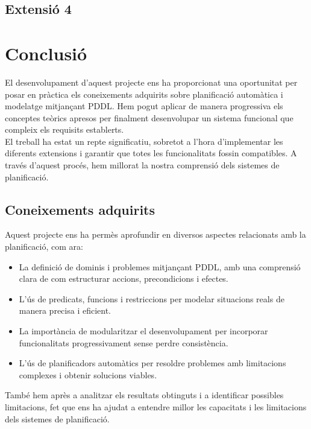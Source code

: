 \documentclass[a4paper]{article}
\begin{document}
	\subsection{Extensió 4}
	
	
	
	\newpage
	\section{Conclusió}
	
	El desenvolupament d'aquest projecte ens ha proporcionat una oportunitat per posar en pràctica els coneixements adquirits sobre planificació automàtica i modelatge mitjançant PDDL. Hem pogut aplicar de manera progressiva els conceptes teòrics apresos per finalment desenvolupar un sistema funcional que compleix els requisits establerts.\\ 
	
	El treball ha estat un repte significatiu, sobretot a l'hora d'implementar les diferents extensions i garantir que totes les funcionalitats fossin compatibles. A través d'aquest procés, hem millorat la nostra comprensió dels sistemes de planificació.
	
	
	
	\subsection{Coneixements adquirits}
	
	Aquest projecte ens ha permès aprofundir en diversos aspectes relacionats amb la planificació, com ara:
	\begin{itemize}
		\item La definició de dominis i problemes mitjançant PDDL, amb una comprensió clara de com estructurar accions, precondicions i efectes.
		\item L'ús de predicats, funcions i restriccions per modelar situacions reals de manera precisa i eficient.
		\item La importància de modularitzar el desenvolupament per incorporar funcionalitats progressivament sense perdre consistència.
		\item L'ús de planificadors automàtics per resoldre problemes amb limitacions complexes i obtenir solucions viables.
	\end{itemize}
	
	També hem après a analitzar els resultats obtinguts i a identificar possibles limitacions, fet que ens ha ajudat a entendre millor les capacitats i les limitacions dels sistemes de planificació.
	
\end{document}
